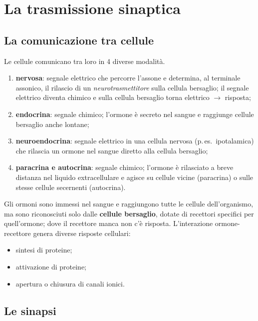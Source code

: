 \chapter{La trasmissione sinaptica}

\section{La comunicazione tra cellule}

Le cellule comunicano tra loro in 4 diverse modalità.
\begin{enumerate}
  \item \textbf{nervosa}: segnale elettrico che percorre l'assone e determina, al terminale
    assonico, il rilascio di un \textit{neurotrasmettitore} sulla cellula bersaglio; il segnale
    elettrico diventa chimico e sulla cellula bersaglio torna elettrico
    $\rightarrow$ risposta;
  \item \textbf{endocrina}: segnale chimico; l'ormone è secreto nel sangue e raggiunge cellule
    bersaglio anche lontane;
  \item \textbf{neuroendocrina}: segnale elettrico in una cellula nervosa (p.\,es.\ ipotalamica)
    che rilascia un ormone nel sangue diretto alla cellula bersaglio;
  \item \textbf{paracrina e autocrina}: segnale chimico; l'ormone è rilasciato a breve distanza nel
    liquido extracellulare e agisce su cellule vicine (paracrina) o sulle stesse cellule secernenti
    (autocrina).
\end{enumerate}

Gli ormoni sono immessi nel sangue e raggiungono tutte le cellule dell'organismo, ma sono
riconosciuti solo dalle \textbf{cellule bersaglio}, dotate di recettori specifici per quell'ormone;
dove il recettore manca non c'è risposta. L'interazione ormone-recettore genera diverse risposte
cellulari:
\begin{itemize}
  \item sintesi di proteine;
  \item attivazione di proteine;
  \item apertura o chiusura di canali ionici.
\end{itemize}

\section{Le sinapsi}

